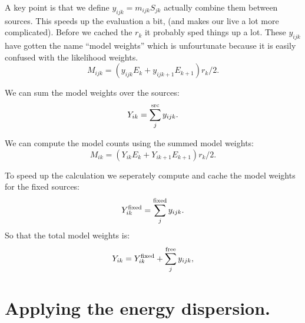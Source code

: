 \documentclass[preprint]{aastex}
\begin{document}
A key point is that we define $y_{ijk} = m_{ijk} S_{jk}$ actually combine them between sources.  This speeds up the evaluation 
a bit, (and makes our live a lot more complicated).   Before we cached the $r_k$ it probably sped things up a lot.  
These $y_{ijk}$ have gotten the name ``model weights'' which is unfourtunate because it is easily confused with the likelihood weights.
\begin{equation}
  M_{ijk} = (y_{ijk} E_k +  y_{ijk+1} E_{k+1}) r_k / 2.
\end{equation}

We can sum the model weights over the sources:
\begin{equation}
  Y_{ik} = \sum_j^{\rm src} y_{ijk}.
\end{equation}

We can compute the model counts using the summed model weights:
\begin{equation}
  M_{ik} = (Y_{ik} E_k +  Y_{ik+1} E_{k+1}) r_k / 2.
\end{equation}

To speed up the calculation we seperately compute and cache the model weights for the fixed sources:
\begin{equation}
  Y_{ik}^{\rm fixed} = \sum_j^{\rm fixed} y_{ijk}.
\end{equation}
So that the total model weights is:
\begin{equation}
  Y_{ik} = Y_{ik}^{\rm fixed} + \sum_j^{\rm free} y_{ijk},
\end{equation}


\section{Applying the energy dispersion.}
\end{document}
